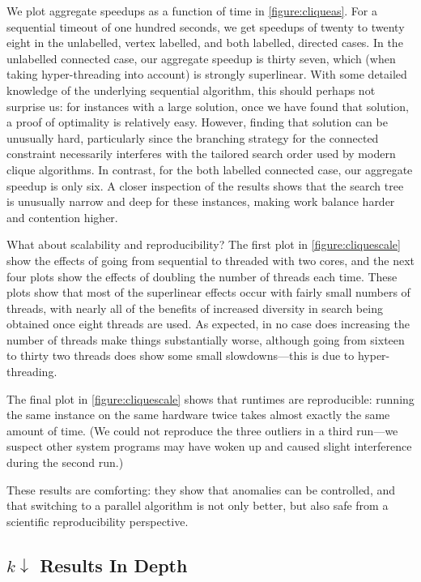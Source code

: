 \documentclass[sigconf]{acmart}
\begin{document}
We plot aggregate speedups as a function of time in \cref{figure:cliqueas}. For a sequential timeout
of one hundred seconds, we get speedups of twenty to twenty eight in the unlabelled, vertex
labelled, and both labelled, directed cases. In the unlabelled connected case, our aggregate speedup
is thirty seven, which (when taking hyper-threading into account) is strongly superlinear.  With
some detailed knowledge of the underlying sequential algorithm, this should perhaps not surprise us:
for instances with a large solution, once we have found that solution, a proof of optimality is
relatively easy. However, finding that solution can be unusually hard, particularly since the
branching strategy for the connected constraint necessarily interferes with the tailored search
order used by modern clique algorithms.  In contrast, for the both labelled connected case, our
aggregate speedup is only six. A closer inspection of the results shows that the search tree is
unusually narrow and deep for these instances, making work balance harder and contention higher.

What about scalability and reproducibility? The first plot in \cref{figure:cliquescale} show the
effects of going from sequential to threaded with two cores, and the next four plots show the
effects of doubling the number of threads each time. These plots show that most of the superlinear
effects occur with fairly small numbers of threads, with nearly all of the benefits of increased
diversity in search being obtained once eight threads are used. As expected, in no case does
increasing the number of threads make things substantially worse, although going from sixteen to
thirty two threads does show some small slowdowns---this is due to hyper-threading.

The final plot in \cref{figure:cliquescale} shows that runtimes are reproducible: running the same
instance on the same hardware twice takes almost exactly the same amount of time. (We could not
reproduce the three outliers in a third run---we suspect other system programs may have woken up
and caused slight interference during the second run.)

These results are comforting: they show that anomalies can be controlled, and that
switching to a parallel algorithm is not only better, but also safe from a scientific
reproducibility perspective.

\subsection{$k{\downarrow}$ Results In Depth}
\end{document}
